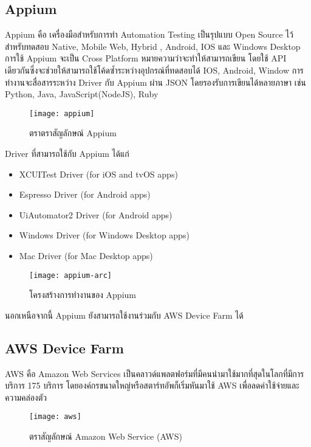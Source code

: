     \subsection{Appium}
        Appium คือ เครื่องมือสำหรับการทำ Automation Testing เป็นรุปแบบ Open Source ไว้สำหรับทดสอบ Native, Mobile Web, Hybrid
        , Android, IOS และ Windows Desktop การใช้ Appium จะเป็น Cross Platform หมายความว่าจะทำให้สามารถเขียน
        โดยใช้ API เดียวกันซึ่งจะช่วยให้สามารถใช้โค้ดซ้ำระหว่างอุปกรณ์ที่ทดสอบได้ IOS, Android, Window การทำงานจะสื่อสารระหว่าง Driver กับ Appium ผ่าน JSON โดยรองรับการเขียนได้หลายภาษา
        เช่น Python, Java, JavaScript(NodeJS), Ruby 
        \begin{figure}[H]
            \centering
            \texttt{[image: appium]}
            \caption{ตราตราสัญลักษณ์ Appium}\label{appium}
        \end{figure}

        Driver ที่สามารถใช้กับ Appium ได้แก่
        \begin{itemize}
            \item XCUITest Driver (for iOS and tvOS apps)
            \item Espresso Driver (for Android apps)
            \item UiAutomator2 Driver (for Android apps)
            \item Windows Driver (for Windows Desktop apps)
            \item Mac Driver (for Mac Desktop apps)
        \end{itemize}

        \begin{figure}[H]
            \centering
            \texttt{[image: appium-arc]}
            \caption{โครงสร้างการทำงานของ Appium}\label{appium-arc}
        \end{figure}

        นอกเหนือจากนี้ Appium ยังสามารถใช้งานร่วมกับ AWS Device Farm ได้

    \subsection{AWS Device Farm}
         AWS คือ Amazon Web Services เป็นคลาวด์แพลตฟอร์มที่มีคนนำมาใช้มากที่สุดในโลกที่มีการบริการ 175 บริการ
         โดยองค์กรขนาดใหญ่หรือสตาร์ทอัพก็เริ่มหันมาใช้ AWS เพื่อลดค่าใช้จ่ายและความคล่องตัว

        \begin{figure}[H]
            \centering
            \texttt{[image: aws]}
            \caption{ตราสัญลักษณ์ Amazon Web Service (AWS)}\label{aws}
        \end{figure}

